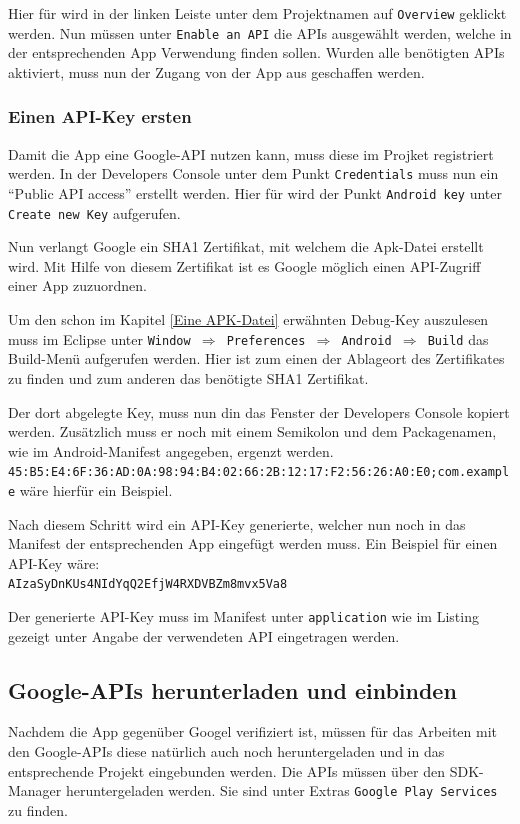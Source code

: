 Hier f\"ur wird in der linken Leiste unter dem Projektnamen auf \texttt{Overview} geklickt werden. Nun m\"ussen unter \texttt{Enable an API} die APIs ausgew\"ahlt werden, welche in der entsprechenden App Verwendung finden sollen. Wurden alle ben\"otigten APIs aktiviert, muss nun der Zugang von der App aus geschaffen werden. \cite{GDevMaps}

\subsubsection{Einen API-Key ersten}
Damit die App eine Google-API nutzen kann, muss diese im Projket registriert werden. In der Developers Console unter dem Punkt \texttt{Credentials} muss nun ein "`Public API access"' erstellt werden. Hier f\"ur wird der Punkt \texttt{Android key} unter \texttt{Create new Key} aufgerufen. 

Nun verlangt Google ein SHA1 Zertifikat, mit welchem die Apk-Datei erstellt wird. Mit Hilfe von diesem Zertifikat ist es Google m\"oglich einen API-Zugriff einer App zuzuordnen.

Um den schon im Kapitel \ref{Eine APK-Datei} erw\"ahnten Debug-Key auszulesen muss im Eclipse unter \texttt{Window $\Rightarrow$ Preferences $\Rightarrow$ Android $\Rightarrow$ Build} das Build-Men\"u aufgerufen werden. Hier ist zum einen der Ablageort des Zertifikates zu finden und zum anderen das ben\"otigte SHA1 Zertifikat.

Der dort abgelegte Key, muss nun din das Fenster der Developers Console kopiert werden. Zus\"atzlich muss er noch mit einem Semikolon und dem Packagenamen, wie im Android-Manifest angegeben, ergenzt werden. \\\texttt{45:B5:E4:6F:36:AD:0A:98:94:B4:02:66:2B:12:17:F2:56:26:A0:E0;com.example} w\"are hierf\"ur ein Beispiel. 
\cite{GolemHBGoogleServices} \cite{Android44}

Nach diesem Schritt wird ein API-Key generierte, welcher nun noch in das Manifest der entsprechenden App eingef\"ugt werden muss.
Ein Beispiel f\"ur einen API-Key w\"are: \\\texttt{AIzaSyDnKUs4NIdYqQ2EfjW4RXDVBZm8mvx5Va8}

Der generierte API-Key muss im Manifest unter \texttt{application} wie im Listing gezeigt unter Angabe der verwendeten API eingetragen werden. 


\subsection{Google-APIs herunterladen und einbinden}
Nachdem die App gegen\"uber Googel verifiziert ist, m\"ussen f\"ur das Arbeiten mit den Google-APIs diese nat\"urlich auch noch heruntergeladen und in das entsprechende Projekt eingebunden werden. Die APIs m\"ussen \"uber den \ac{SDK}-Manager heruntergeladen werden. Sie sind unter Extras \texttt{Google Play Services} zu finden.

